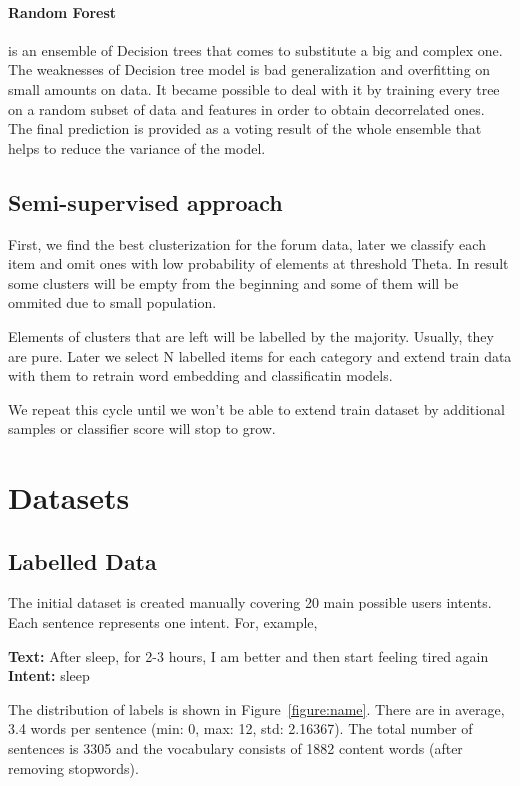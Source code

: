 \documentclass[11pt]{article}
\begin{document}
\paragraph{Random Forest} is an ensemble of Decision trees that comes to substitute a big and complex one. The weaknesses of Decision tree model is bad generalization and overfitting on small amounts on data. It became possible to deal with it by training every tree on a random subset of data and features in order to obtain decorrelated ones. The final prediction is provided as a voting result of the whole ensemble that helps to reduce the variance of the model.


\subsection{Semi-supervised approach}

First, we find the best clusterization for the forum data, later we classify each item and omit ones with low probability of elements at threshold Theta. In result some clusters will be empty from the beginning and some of them will be ommited due to small population.

Elements of clusters that are left will be labelled by the majority. Usually, they are pure. Later we select N labelled items for each category and extend train data with them to retrain word embedding and classificatin models.

We repeat this cycle until we won't be able to extend train dataset by additional samples or classifier score will stop to grow.

\section{Datasets}



\subsection{Labelled Data}

The initial dataset is created manually covering 20 main possible users intents. Each sentence represents one intent. For, example,

\textbf{Text:} After sleep, for 2-3 hours, I am better and then start feeling tired again\\
\textbf{Intent:} sleep

The distribution of labels is shown in Figure~\ref{figure:name}. There
are in average, 3.4 words per sentence (min: 0, max: 12, std:
2.16367).  The total number of sentences is 3305 and the vocabulary
consists of 1882 content words (after removing stopwords).
\end{document}
